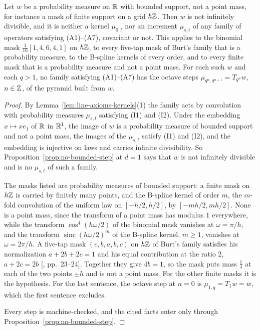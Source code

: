 \begin{proposition}
\label{prop:classical-kernels-no-exact-cascade}

Let $w$ be a probability measure on $\mathbb{R}$ with bounded support, not a point mass, for instance a
mask of finite support on a grid $h\mathbb{Z}$. Then $w$ is not infinitely divisible, and it is neither a
kernel $\mu_{0,t}$ nor an increment $\mu_{s,t}$ of any family of operators satisfying (A1)--(A7),
covariant or not. This applies to the binomial mask $\tfrac1{16}[1,4,6,4,1]$ on $h\mathbb{Z}$, to every
five-tap mask of Burt's family that is a probability measure, to the B-spline kernels of every
order, and to every finite mask that is a probability measure and not a point mass. For each such
$w$ and each $q > 1$, no family satisfying
(A1)--(A7) has the octave steps $\mu_{q^n,q^{n+1}} = T_{q^n}w$, $n \in \mathbb{Z}$, of the pyramid built
from $w$.
\end{proposition}

\begin{proof}
By Lemma~\ref{lem:line-axioms-kernels}(1) the family acts by convolution with probability
measures $\mu_{s,t}$ satisfying (I1) and (I2). Under the embedding $x \mapsto xe_1$ of $\mathbb{R}$ in
$\mathbb{R}^1$, the image of $w$ is a probability measure of bounded support and not a point mass, the
images of the $\mu_{s,t}$ satisfy (I1) and (I2), and the embedding is injective on laws and
carries infinite divisibility. So Proposition~\ref{prop:no-bounded-step} at $d = 1$ says that
$w$ is not infinitely divisible and is no $\mu_{s,t}$ of such a family.

The masks listed are probability measures of bounded support: a finite mask on $h\mathbb{Z}$ is carried
by finitely many points, and the B-spline kernel of order $m$, the $m$-fold convolution of the
uniform law on $[-h/2, h/2]$, by $[-mh/2, mh/2]$. None is a point mass, since the transform of a
point mass has modulus $1$ everywhere, while the transform $\cos^4(h\omega/2)$ of the binomial
mask vanishes at $\omega = \pi/h$, and the transform $\operatorname{sinc}(h\omega/2)^m$ of the
B-spline kernel, $m \ge 1$, vanishes at $\omega = 2\pi/h$.
A five-tap mask $(c, b, a, b, c)$ on $h\mathbb{Z}$ of Burt's family satisfies his normalization
$a + 2b + 2c = 1$ and his equal contribution at the ratio $2$, $a + 2c = 2b$
[, pp.~23--24]. Together they give $4b = 1$, so the mask puts mass
$\tfrac14$ at each of the two points $\pm h$ and is not a point mass. For the other finite
masks it is the hypothesis. For the last sentence, the octave step at $n = 0$ is $\mu_{1,q} = T_1w = w$, which the
first sentence excludes.

Every step is machine-checked, and the cited facts enter only through
Proposition~\ref{prop:no-bounded-step}.
\end{proof}

